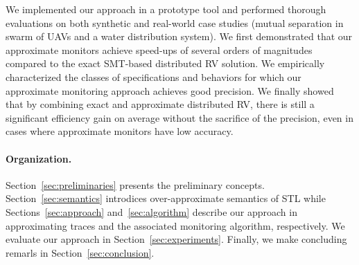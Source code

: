 We implemented our approach in a prototype tool and performed thorough evaluations on both 
synthetic and real-world case studies (mutual separation in swarm of UAVs and a water distribution 
system).
%
We first demonstrated that our approximate monitors achieve speed-ups of several orders of 
magnitudes compared to the exact SMT-based distributed RV solution.
%
We empirically characterized the classes of specifications and behaviors for which our approximate 
monitoring approach achieves good precision.
%
We finally showed that by combining exact and approximate distributed RV, there is still a 
significant efficiency gain on average without the sacrifice of the precision, even in cases where 
approximate monitors have low accuracy. 

\paragraph{Organization.} Section~\ref{sec:preliminaries} presents the preliminary concepts.
%
Section~\ref{sec:semantics} introdices over-approximate semantics of STL while 
Sections~\ref{sec:approach} and~\ref{sec:algorithm} describe our approach in approximating traces 
and the associated monitoring algorithm, respectively.
%
We evaluate our approach in Section~\ref{sec:experiments}. Finally, we make concluding remarls in 
Section~\ref{sec:conclusion}.